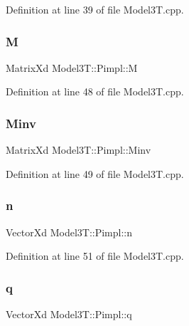 Definition at line 39 of file Model3\+T.\+cpp.

\hypertarget{structModel3T_1_1Pimpl_a2756947646bc2a7485760f1599011764}{}\label{structModel3T_1_1Pimpl_a2756947646bc2a7485760f1599011764} 
\subsubsection{\texorpdfstring{M}{M}}
{\footnotesize\ttfamily Matrix\+Xd Model3\+T\+::\+Pimpl\+::M}



Definition at line 48 of file Model3\+T.\+cpp.

\hypertarget{structModel3T_1_1Pimpl_a6e50170f8b2b58e1e7a91244ffe1691c}{}\label{structModel3T_1_1Pimpl_a6e50170f8b2b58e1e7a91244ffe1691c} 
\subsubsection{\texorpdfstring{Minv}{Minv}}
{\footnotesize\ttfamily Matrix\+Xd Model3\+T\+::\+Pimpl\+::\+Minv}



Definition at line 49 of file Model3\+T.\+cpp.

\hypertarget{structModel3T_1_1Pimpl_a964360277690839fc358bb663a2cd949}{}\label{structModel3T_1_1Pimpl_a964360277690839fc358bb663a2cd949} 
\subsubsection{\texorpdfstring{n}{n}}
{\footnotesize\ttfamily Vector\+Xd Model3\+T\+::\+Pimpl\+::n}



Definition at line 51 of file Model3\+T.\+cpp.

\hypertarget{structModel3T_1_1Pimpl_aafa871718688ff6322cbfffed9ada401}{}\label{structModel3T_1_1Pimpl_aafa871718688ff6322cbfffed9ada401} 
\subsubsection{\texorpdfstring{q}{q}}
{\footnotesize\ttfamily Vector\+Xd Model3\+T\+::\+Pimpl\+::q}



